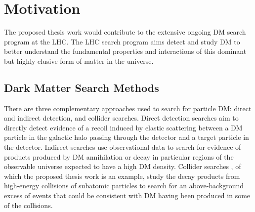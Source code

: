 \documentclass[12pt]{article}
\begin{document}

\section{Motivation}

The proposed thesis work would contribute to the extensive ongoing DM search program at the LHC. The LHC search program aims detect and study DM to better understand the fundamental properties and interactions of this dominant but highly elusive form of matter in the universe. 


\subsection{Dark Matter Search Methods}
There are three complementary approaches used to search for particle DM: direct and indirect detection, and collider searches. Direct detection searches \cite{Schumann_2019, 2015gya} aim to directly detect evidence of a recoil induced by elastic scattering between a DM particle in the galactic halo passing through the detector and a target particle in the detector. Indirect searches \cite{CIRELLI_2012, conrad} use observational data to search for evidence of products produced by DM annihilation or decay in particular regions of the observable universe expected to have a high DM density. Collider searches \cite{DM_colliders}, of which the proposed thesis work is an example, study the decay products from high-energy collisions of subatomic particles to search for an above-background excess of events that could be consistent with DM having been produced in some of the collisions.
\end{document}
